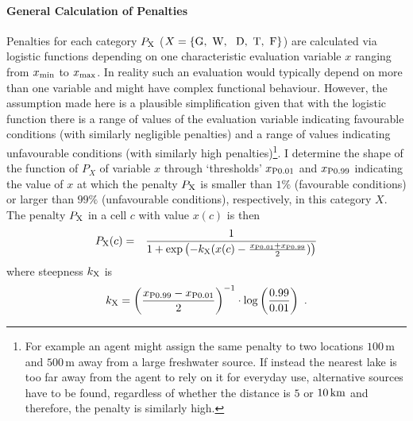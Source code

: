 \paragraph{General Calculation of Penalties}
Penalties for each category $P_{\rm X}$ ($X=\{\text{G,\, W, \, D,\, T,\, F}\}$) are calculated via logistic functions depending on one characteristic evaluation variable $x$ ranging from $x_{\rm min}$ to $x_{\rm max}$.
In reality such an evaluation would typically depend on more than one variable and might have complex functional behaviour.
However, the assumption made here is a plausible simplification given that with the logistic function there is a range of values of the evaluation variable indicating favourable conditions (with similarly negligible penalties) and a range of values indicating unfavourable conditions (with similarly high penalties)\footnote{For example an agent might assign the same penalty to two locations $100\, \text{m}$ and $500\, \text{m}$ away from a large freshwater source. If instead the nearest lake is too far away from the agent to rely on it for everyday use, alternative sources have to be found, regardless of whether the distance is $5$ or $10\, {\rm km}$ and therefore, the penalty is similarly high.}.
I determine the shape of the function of $P_X$ of variable $x$ through `thresholds' $x_{\rm P0.01}$ and $x_{\rm P0.99}$ indicating the value of $x$ at which the penalty $P_{\rm X}$ is smaller than $1\%$ (favourable conditions) or larger than $99\%$ (unfavourable conditions), respectively, in this category $X$.
The penalty $P_{\rm X}$ in a cell $c$ with value $x(c)$ is then
\begin{eqnarray}\label{eq:P_X(c)}
	P_{\rm X}(c) & = & \frac{1}{1+\exp\left( - k_{\rm X} (x(c)-\frac{x_{\rm P0.01}+x_{\rm P0.99}}{2}) \right)} %
\end{eqnarray}
where steepness $k_{\rm X}$ is 
\begin{equation}\label{eq:k}
k_{\rm X} = \left(\frac{x_{\rm P0.99}-{x_{\rm P0.01}}}{2}\right)^{-1} \cdot \log\left(\frac{0.99}{0.01}\right) \ .
\end{equation}
